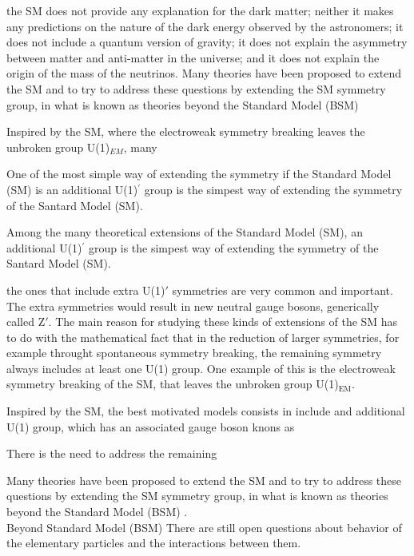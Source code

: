 the SM does not provide any explanation for the dark matter; neither it makes any predictions on the nature of
the dark energy observed by the astronomers; it does not include a quantum version of gravity; it does
not explain the asymmetry between matter and anti-matter in the universe; and it does not explain
the origin of the mass of the neutrinos. Many theories have been proposed to extend the SM and to try
to address these questions by extending the SM symmetry group, in what is known as theories beyond
the Standard Model (BSM)

Inspired by the
SM, where the electroweak symmetry breaking leaves the unbroken group U(1)$_{EM}$, many 

One of 
the most simple way of extending the symmetry if the Standard Model (SM) is an additional U(1)$^{\prime}$ group 
is the simpest way of extending the symmetry of the 
Santard Model (SM). 


Among the many theoretical extensions of the 
Standard Model (SM), an additional U(1)$^{\prime}$ group 
is the simpest way of extending the symmetry of the 
Santard Model (SM). 


the ones that include extra U(1)$'$
symmetries are very common and important.  The extra symmetries would result in new
neutral gauge bosons, generically called Z$'$. The main reason for studying these kinds
of extensions of the SM has to do with the mathematical fact that in the reduction of larger
symmetries, for example throught spontaneous symmetry breaking, the remaining symmetry always includes
at least one U(1) group.  One example of this is the electroweak symmetry breaking of the SM, that leaves
the unbroken group U(1)$_{\text{EM}}$.

Inspired by the SM, the best motivated models consists in include and additional U(1) group, which 
has an associated gauge boson knons as \Zprime

There is the need to address the remaining 


Many theories have been proposed to extend the SM and to try to address these questions
by extending the SM symmetry group, in what is known as theories beyond the Standard Model (BSM) \cite{SMProblems}.\\

Beyond Standard Model (BSM) 
There are still open questions about behavior of the elementary particles and the interactions between them. 







